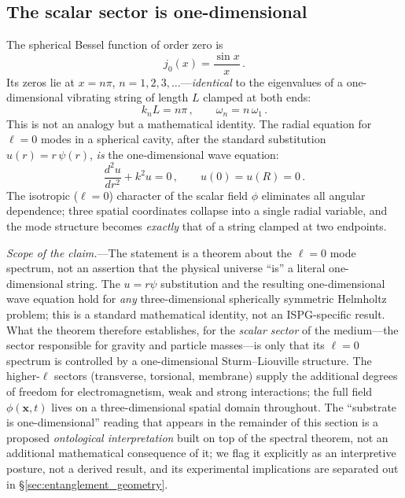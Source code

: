 \documentclass[11pt]{article}
\begin{document}
\subsection{The scalar sector is
one-dimensional}
\label{sec:1D_substrate}

The spherical Bessel function of order zero is
\begin{equation}\label{eq:j0_sin}
  j_0(x) = \frac{\sin x}{x}\,.
\end{equation}
Its zeros lie at $x = n\pi$, $n = 1, 2, 3,
\ldots$---\emph{identical} to the eigenvalues
of a one-dimensional vibrating string of length
$L$ clamped at both ends:
\begin{equation}\label{eq:string_eigenvalues}
  k_n L = n\pi \,,\qquad
  \omega_n = n\,\omega_1\,.
\end{equation}
This is not an analogy but a mathematical
identity.  The radial equation for $\ell = 0$
modes in a spherical cavity, after the standard
substitution $u(r) = r\,\psi(r)$, \emph{is}
the one-dimensional wave equation:
\begin{equation}\label{eq:radial_1D}
  \frac{d^2 u}{dr^2} + k^2 u = 0\,,\qquad
  u(0) = u(R) = 0\,.
\end{equation}
The isotropic ($\ell = 0$) character of the
scalar field $\phi$ eliminates all angular
dependence; three spatial coordinates collapse
into a single radial variable, and the mode
structure becomes \emph{exactly} that of a
string clamped at two endpoints.

\textit{Scope of the claim.}---The statement is
a theorem about the $\ell = 0$ mode spectrum,
not an assertion that the physical universe
``is'' a literal one-dimensional string.  The
$u = r\psi$ substitution and the resulting
one-dimensional wave equation hold for \emph{any}
three-dimensional spherically symmetric
Helmholtz problem; this is a standard
mathematical identity, not an ISPG-specific
result.  What the theorem therefore establishes,
for the \emph{scalar sector} of the medium---the
sector responsible for gravity and particle
masses---is only that its $\ell=0$ spectrum is
controlled by a one-dimensional
Sturm--Liouville structure.  The higher-$\ell$
sectors (transverse, torsional, membrane)
supply the additional degrees of freedom for
electromagnetism, weak and strong interactions;
the full field $\phi(\mathbf{x},t)$ lives on a
three-dimensional spatial domain throughout.
The ``substrate is one-dimensional'' reading
that appears in the remainder of this section
is a proposed \emph{ontological interpretation}
built on top of the spectral theorem, not an
additional mathematical consequence of it; we
flag it explicitly as an interpretive posture,
not a derived result, and its experimental
implications are separated out in
\S\ref{sec:entanglement_geometry}.
\end{document}
